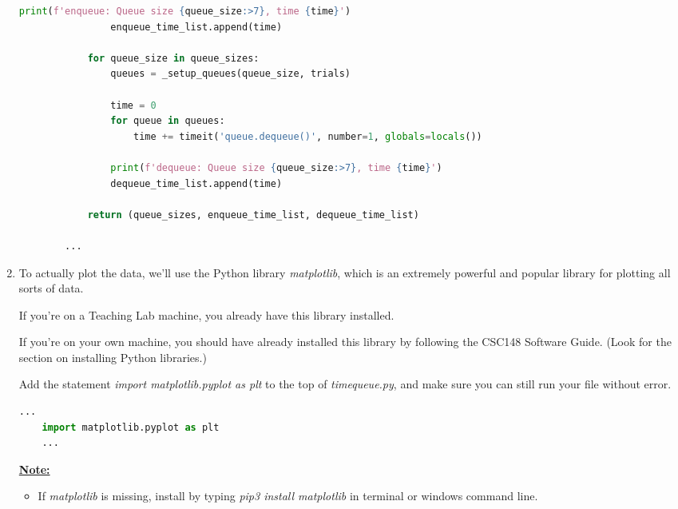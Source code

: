 \documentclass[12pt]{article}
\begin{document}
\begin{enumerate}[1.]
\begin{mdframed}
\begin{lstlisting}[language=Python,caption={task\_4\_q1\_solution.py},captionpos=b]
                print(f'enqueue: Queue size {queue_size:>7}, time {time}')
                enqueue_time_list.append(time)

            for queue_size in queue_sizes:
                queues = _setup_queues(queue_size, trials)

                time = 0
                for queue in queues:
                    time += timeit('queue.dequeue()', number=1, globals=locals())

                print(f'dequeue: Queue size {queue_size:>7}, time {time}')
                dequeue_time_list.append(time)

            return (queue_sizes, enqueue_time_list, dequeue_time_list)

        ...
        \end{lstlisting}
    \end{mdframed}

    \item To actually plot the data, we’ll use the Python library \textit{matplotlib},
    which is an extremely powerful and popular library for plotting all sorts of
    data.

    \bigskip

    If you’re on a Teaching Lab machine, you already have this library installed.

    \bigskip

    If you’re on your own machine, you should have already installed this library
    by following the CSC148 Software Guide. (Look for the section on installing
    Python libraries.)

    \bigskip

    Add the statement \textit{import matplotlib.pyplot as plt} to the top of \textit{timequeue.py},
    and make sure you can still run your file without error.

    \bigskip

    \begin{mdframed}

    \begin{lstlisting}[language=Python,caption={task\_4\_q2\_solution.py},captionpos=b]
    ...
    import matplotlib.pyplot as plt
    ...
    \end{lstlisting}

    \bigskip

    \underline{\textbf{Note:}}

    \begin{itemize}
        \item
        If \textit{matplotlib} is missing, install by typing \textit{pip3 install matplotlib}
        in terminal or windows command line.
    \end{itemize}


\end{mdframed}
\end{enumerate}
\end{document}
